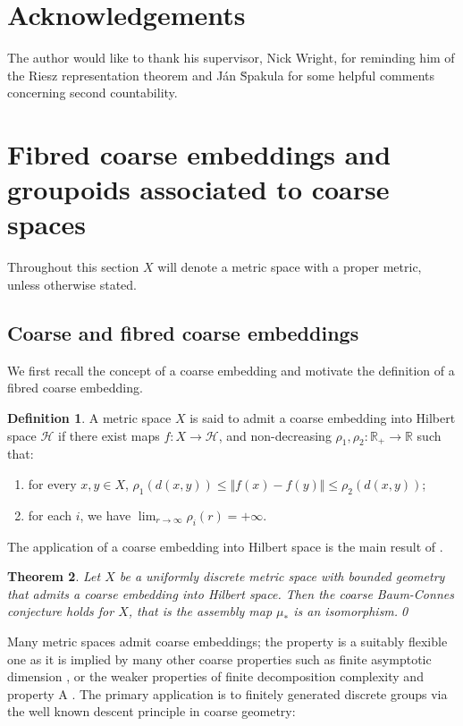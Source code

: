 \documentclass[preprint]{elsarticle}
\theoremstyle{plain}
\newtheorem{theorem}{Theorem}%
\theoremstyle{definition}%
\newtheorem{definition}[theorem]{Definition}%
\theoremstyle{remark}%
\begin{document}
\section*{Acknowledgements}
The author would like to thank his supervisor, Nick Wright, for reminding him of the Riesz representation theorem and J\'{a}n \u{S}pakula for some helpful comments concerning second countability.

\section{Fibred coarse embeddings and groupoids associated to coarse spaces}\label{sect:coarse}
Throughout this section $X$ will denote a metric space with a proper metric, unless otherwise stated.

\subsection{Coarse and fibred coarse embeddings}
We first recall the concept of a coarse embedding and motivate the definition of a fibred coarse embedding.

\begin{definition}\label{def:FCE}
A metric space $X$ is said to admit a coarse embedding into Hilbert space $\mathcal{H}$ if there exist maps $f:X \rightarrow \mathcal{H}$,  and non-decreasing $\rho_{1},\rho_{2}:\mathbb{R}_{+} \rightarrow \mathbb{R}$ such that:
\begin{enumerate}
\item for every $x,y \in X$, $\rho_{1}(d(x,y)) \leq \Vert f(x) - f(y) \Vert \leq \rho_{2}(d(x,y))$;
\item for each $i$, we have $\lim_{r \rightarrow \infty}\rho_{i}(r) = +\infty$.
\end{enumerate}
\end{definition}

The application of a coarse embedding into Hilbert space is the main result of \cite{MR1728880, MR1905840}.

\begin{theorem}
Let $X$ be a uniformly discrete metric space with bounded geometry that admits a coarse embedding into Hilbert space. Then the coarse Baum-Connes conjecture holds for $X$, that is the assembly map $\mu_{*}$ is an isomorphism.\qed
\end{theorem}

Many metric spaces admit coarse embeddings; the property is a suitably flexible one as it is implied by many other coarse properties such as finite asymptotic dimension \cite{MR1739727}, or the weaker properties of finite decomposition complexity \cite{MR2947546} and property A \cite{MR1728880}. The primary application is to finitely generated discrete groups via the well known descent principle in coarse geometry:
\end{document}
